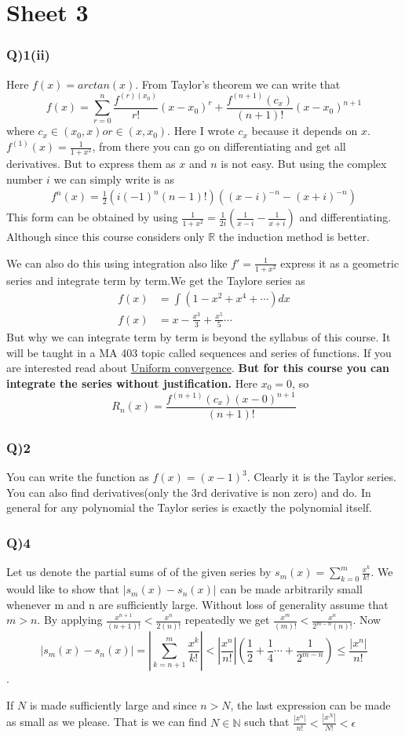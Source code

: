 \documentclass[11pt]{beamer}
\begin{document}
\section{Sheet 3}
\begin{frame}
\frametitle{Q)1(ii)}
Here $f(x)=arctan(x)$. From Taylor's theorem we can write that
$$f(x)=\sum_{r=0}^{n}\dfrac{f^{(r)(x_0)}}{r!}(x-x_0)^{r}+\dfrac{f^{(n+1)}(c_x)}{(n+1)!}(x-x_0)^{n+1}$$
where $c_x\in (x_0,x) or \in (x,x_0)$. Here I wrote $c_x$ because it depends on $x$. $f^{(1)}(x)=\frac{1}{1+x^2}$, from there you can go on differentiating and get all derivatives. But to express them as $x$ and $n$ is not easy. But using the complex number $i$ we can simply write is as
\begin{align*}
f^{n}(x)=\frac{1}{2}(i(-1)^{n}(n-1)!)((x-i)^{-n}-(x+i)^{-n})
\end{align*}
This form can be obtained by using $\frac{1}{1+x^2}=\frac{1}{2i}(\frac{1}{x-i}-\frac{1}{x+i})$ and differentiating. Although since this course considers only $\mathbb{R}$ the induction method is better.
\end{frame}
\begin{frame}
We can also do this using integration also like $f'=\frac{1}{1+x^2}$ express it as a geometric series and integrate term by term.We get the Taylore series as
\begin{align*}
f(x)&=\int (1-x^2+x^4+\cdots )dx \\
f(x)&=x-\frac{x^3}{3}+\frac{x^5}{5}\cdots 
\end{align*}
But why we can integrate term by term is beyond the syllabus of this course. It will be taught in a MA 403 topic called sequences and series of functions. If you are interested read about \href{https://en.wikipedia.org/wiki/Uniform_convergence}{Uniform convergence}. \textbf{But for this course you can integrate the series without justification.} Here $x_0=0$, so
$$R_n(x)=\frac{f^{(n+1)}(c_x)(x-0)^{n+1}}{(n+1)!}$$
\end{frame}
\begin{frame}

\frametitle{Q)2}
You can write the function as $f(x)=(x-1)^3$. Clearly it is the Taylor series. You can also find derivatives(only the 3rd derivative is non zero) and do. In general for any polynomial the Taylor series is exactly the polynomial itself.
\end{frame}
\begin{frame}
\frametitle{Q)4}
Let us denote the partial sums of of the given series by $s_m(x)=\sum_{k=0}^{m}\frac{x^k}{k!}$. We would like to show that $|s_m(x) - s_n(x)|$ can be made arbitrarily small whenever m and n are sufficiently large. Without loss of generality assume that $m>n$. By applying $\frac{x^{n+1}}{(n+1)!}<\frac{x^{n}}{2(n)!}$ repeatedly we get $\frac{x^{m}}{(m)!}<\frac{x^{n}}{2^{m-n}(n)!}$. Now
$$|s_m(x) -s_n(x)|=\left\lvert\sum_{k=n+1}^{m}\frac{x^k}{k!}\right\rvert< \left\lvert\frac{x^n}{n!}\right\rvert\left(\frac{1}{2}+\frac{1}{4}\cdots +\frac{1}{2^{m-n}}\right)\leq \frac{|x^n|}{n!}$$.

If $N$ is made sufficiently large and since $n > N$, the last expression can be made as small as we please. That is we can find $N\in \mathbb{N}$ such that $\frac{|x^n|}{n!}<\frac{|x^N|}{N!}<\epsilon $
\end{frame}
\end{document}
